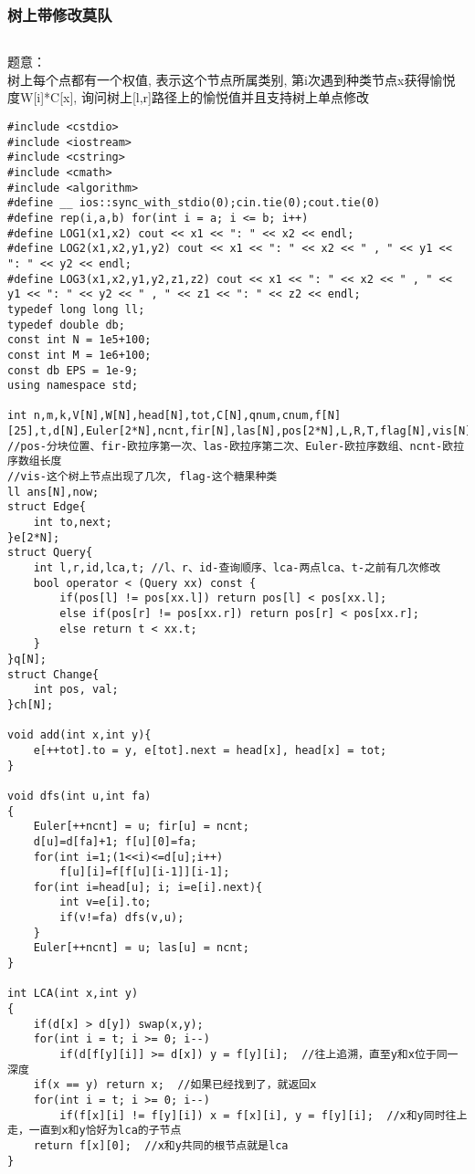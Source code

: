\documentclass[twoside]{article}
\begin{document}
\subsubsection{树上带修改莫队}
\begin{lstlisting}
\end{lstlisting}
题意：\\
树上每个点都有一个权值, 表示这个节点所属类别, 第i次遇到种类节点x获得愉悦度W[i]*C[x], 询问树上[l,r]路径上的愉悦值并且支持树上单点修改\\
\begin{lstlisting}
#include <cstdio>
#include <iostream>
#include <cstring>
#include <cmath>
#include <algorithm>
#define __ ios::sync_with_stdio(0);cin.tie(0);cout.tie(0)
#define rep(i,a,b) for(int i = a; i <= b; i++)
#define LOG1(x1,x2) cout << x1 << ": " << x2 << endl;
#define LOG2(x1,x2,y1,y2) cout << x1 << ": " << x2 << " , " << y1 << ": " << y2 << endl;
#define LOG3(x1,x2,y1,y2,z1,z2) cout << x1 << ": " << x2 << " , " << y1 << ": " << y2 << " , " << z1 << ": " << z2 << endl;
typedef long long ll;
typedef double db;
const int N = 1e5+100;
const int M = 1e6+100;
const db EPS = 1e-9;
using namespace std;

int n,m,k,V[N],W[N],head[N],tot,C[N],qnum,cnum,f[N][25],t,d[N],Euler[2*N],ncnt,fir[N],las[N],pos[2*N],L,R,T,flag[N],vis[N];
//pos-分块位置、fir-欧拉序第一次、las-欧拉序第二次、Euler-欧拉序数组、ncnt-欧拉序数组长度
//vis-这个树上节点出现了几次, flag-这个糖果种类
ll ans[N],now;
struct Edge{
	int to,next;
}e[2*N];
struct Query{
	int l,r,id,lca,t; //l、r、id-查询顺序、lca-两点lca、t-之前有几次修改
	bool operator < (Query xx) const {
		if(pos[l] != pos[xx.l]) return pos[l] < pos[xx.l];
		else if(pos[r] != pos[xx.r]) return pos[r] < pos[xx.r];
		else return t < xx.t;
	}
}q[N];
struct Change{
	int pos, val;
}ch[N];

void add(int x,int y){
	e[++tot].to = y, e[tot].next = head[x], head[x] = tot;
}

void dfs(int u,int fa)
{
	Euler[++ncnt] = u; fir[u] = ncnt;
    d[u]=d[fa]+1; f[u][0]=fa;
    for(int i=1;(1<<i)<=d[u];i++)
        f[u][i]=f[f[u][i-1]][i-1];
    for(int i=head[u]; i; i=e[i].next){
        int v=e[i].to;
        if(v!=fa) dfs(v,u);
    }
    Euler[++ncnt] = u; las[u] = ncnt;
}    

int LCA(int x,int y)
{
	if(d[x] > d[y]) swap(x,y);
	for(int i = t; i >= 0; i--)
		if(d[f[y][i]] >= d[x]) y = f[y][i];  //往上追溯，直至y和x位于同一深度
	if(x == y) return x;  //如果已经找到了，就返回x
	for(int i = t; i >= 0; i--)
		if(f[x][i] != f[y][i]) x = f[x][i], y = f[y][i];  //x和y同时往上走，一直到x和y恰好为lca的子节点
	return f[x][0];  //x和y共同的根节点就是lca 
}


\end{lstlisting}
\end{document}
